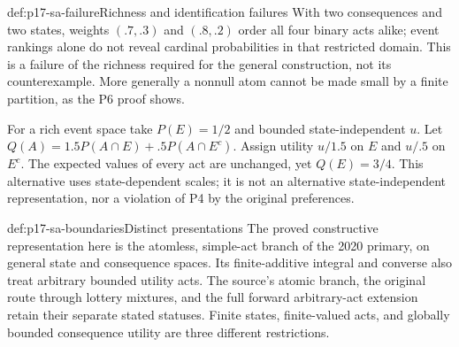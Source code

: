 \begin{hbexample}{def:p17-sa-failure}{Richness and identification failures}
With two consequences and two states, weights \((.7,.3)\)
and \((.8,.2)\) order all four binary acts alike; event
rankings alone do not reveal cardinal probabilities in
that restricted domain. This is a failure of the richness
required for the general construction, not its counterexample.
More generally a nonnull atom cannot be made small by a
finite partition, as the P6 proof shows.

For a rich event space take \(P(E)=1/2\) and bounded
state-independent \(u\). Let
\(Q(A)=1.5P(A\cap E)+.5P(A\cap E^c)\).
Assign utility \(u/1.5\) on \(E\) and \(u/.5\) on \(E^c\).
The expected values of every act are unchanged, yet
\(Q(E)=3/4\). This alternative uses state-dependent scales;
it is not an alternative state-independent representation,
nor a violation of P4 by the original preferences.
\end{hbexample}

\begin{proofboundary}{def:p17-sa-boundaries}{Distinct presentations}
The proved constructive representation here is the atomless,
simple-act branch of the 2020 primary, on general state and
consequence spaces. Its finite-additive integral and converse
also treat arbitrary bounded utility acts.
The source's atomic branch, the original route through lottery
mixtures, and the full forward arbitrary-act extension retain
their separate stated statuses. Finite states, finite-valued
acts, and globally bounded consequence utility are three
different restrictions.
\end{proofboundary}
